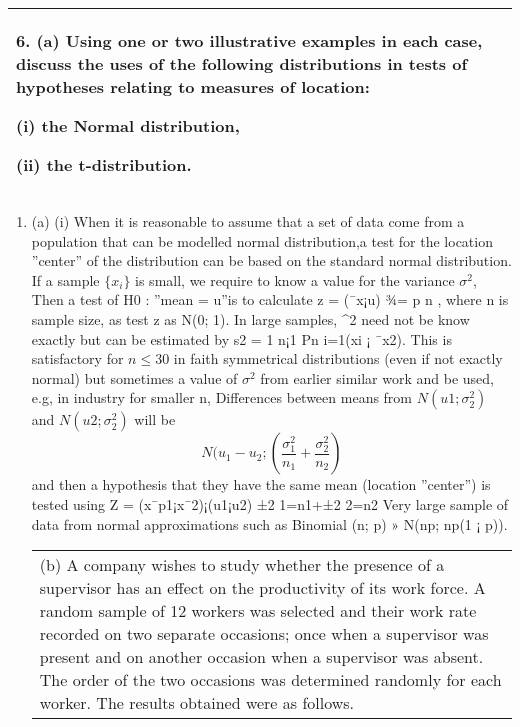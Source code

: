 \documentclass[a4paper,12pt]{article}
\begin{document}
  \begin{table}[ht!]
  \centering
  \begin{tabular}{|p{15cm}|}
  \hline  
6. (a) Using one or two illustrative examples in each case, discuss the uses of the following distributions in tests of hypotheses relating to measures of location: 
 
  (i) the Normal distribution, 

  (ii) the t-distribution. 

 \\ \hline
   \end{tabular}
 \end{table}
 

  
\begin{enumerate}
 \item (a) (i) When it is reasonable to assume that a set of data come from a population that can
be modelled normal distribution,a test for the location ”center” of the distribution
can be based on the standard normal distribution. If a sample $\{x_i\}$ is small, we
require to know a value for the variance $\sigma^2$, Then a test of H0 : ”mean = u”is to
calculate z = (¯x¡u)
¾=
p
n , where n is sample size, as test z as N(0; 1). In large samples,
\sigma^2 need not be know exactly but can be estimated by s2 = 1
n¡1
Pn
i=1(xi ¡ ¯x2).
This is satisfactory for $n\leq 30$ in faith symmetrical distributions (even if not exactly
normal) but sometimes a value of $\sigma^2$ from earlier similar work and be used, e.g,
in industry for smaller n, Differences between means from $N(u1; \sigma^2_2)$ and $N(u2; \sigma^2_2)$
will be \[N(u_1 - u_2; \left(\frac{\sigma^2_1}{n_1}
+ \frac{\sigma^2_2}{n_2}
\right)\] 
and then a hypothesis that they have the same mean
(location ”center”) is tested using Z = (x¯p1¡x¯2)¡(u1¡u2)
±2
1=n1+±2
2=n2
Very large sample of data
from normal approximations such as Binomial (n; p) » N(np; np(1 ¡ p)).
\newpage
  \begin{table}[ht!]
  \centering
  \begin{tabular}{|p{15cm}|}
  \hline  
 (b) A company wishes to study whether the presence of a supervisor has an effect on the productivity of its work force.  A random sample of 12 workers was selected and their work rate recorded on two separate occasions; once when a supervisor was present and on another occasion when a supervisor was absent.  The order of the two occasions was determined randomly for each worker.  The results obtained were as follows. 
 

\end{tabular}
\end{table}
\end{enumerate}
\end{document}
